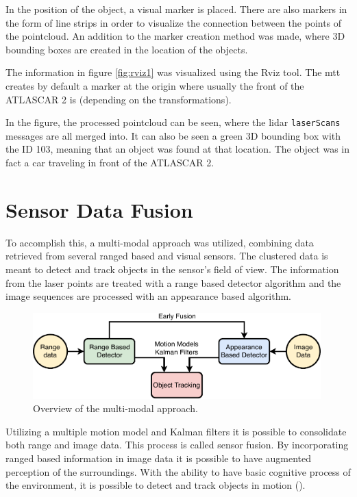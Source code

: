 In the position of the object, a visual marker is placed. There are also markers in the form of line strips in order to visualize the connection between the points of the pointcloud. An addition to the marker creation method was made, where 3D bounding boxes are created in the location of the objects.

The information in figure \ref{fig:rviz1} was visualized using the Rviz tool. The \gls{mtt} creates by default a marker at the origin where usually the front of the ATLASCAR 2 is (depending on the transformations). 

In the figure, the processed pointcloud can be seen, where the \gls{lidar} \texttt{laserScans} messages are all merged into. It can also be seen a green 3D bounding box with the ID 103, meaning that an object was found at that location. The object was in fact a car traveling in front of the ATLASCAR 2. 

\section{Sensor Data Fusion}

To accomplish this, a multi-modal approach was utilized, combining data retrieved from several ranged based and visual sensors. The clustered data is meant to detect and track objects in the sensor's field of view. The information from the laser points are treated with a range based detector algorithm and the image sequences are processed with an appearance based algorithm.

\begin{figure}[htp]
	
	\centering
	\includegraphics[width=0.99\textwidth]{caplabel/imgs/multimodal}
	
	\caption{ Overview of the multi-modal approach. }
	\label{fig:basket}
	
\end{figure}

Utilizing a multiple motion model and Kalman filters it is possible to consolidate both range and image data. This process is called sensor fusion. By incorporating ranged based information in image data it is possible to have augmented perception of the surroundings. With the ability to have basic cognitive process of the environment, it is possible to detect and track objects in motion (\cite{Spinello2010}).

